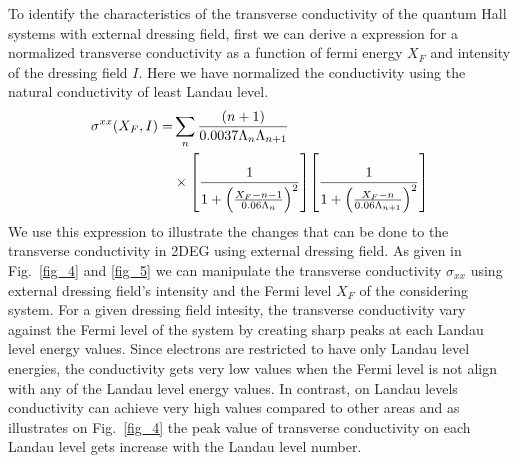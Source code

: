 To identify the characteristics of the transverse conductivity of the quantum Hall systems with external dressing field, first we can derive a expression for a normalized
transverse conductivity as a function of fermi energy $X_F$ and intensity of the dressing field $I$. Here we have normalized the conductivity using the natural conductivity of least Landau level.
\begin{equation} \label{eq_35}
  \begin{aligned}
    \sigma^{xx}(X_F,I) = &
    \sum_{n}
    \frac{\qty(n+1)}{0.0037\Lambda_n \Lambda_{n+1}} \\
    & \times
    \qty[
      \frac{1}
      {
        1 + \qty(\frac{X_F - n -1}{0.06\Lambda_n})^2
      }
    ]
    \qty[
      \frac{1}
      {
        1 + \qty(\frac{X_F - n}{0.06\Lambda_{n+1}})^2
      }
    ]
  \end{aligned}
\end{equation}
We use this expression to illustrate the changes that can be done to the transverse conductivity in 2DEG using external dressing field. As given in Fig.~\ref{fig_4} and \ref{fig_5} we can manipulate the transverse conductivity $\sigma_{xx}$ using external dressing field's intensity and the Fermi level $X_F$ of the considering system. For a given dressing field intesity, the transverse conductivity vary against the Fermi level of the system by creating sharp peaks at each Landau level energy values. Since electrons are restricted to have only Landau level energies, the conductivity gets very low values when the Fermi level is not align with any of the Landau level energy values. In contrast, on Landau levels conductivity can achieve very high values compared to other areas and as illustrates on Fig.~\ref{fig_4} the peak value of transverse conductivity on each Landau level gets increase with the Landau level number.

